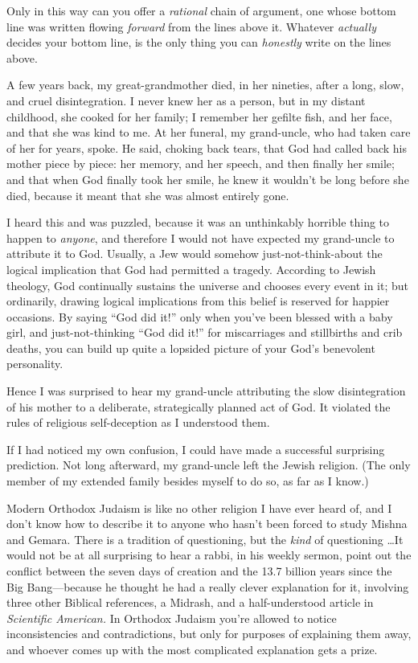 {
 Only in this way can you offer a \textit{rational} chain of
argument, one whose bottom line was written flowing \textit{forward}
from the lines above it. Whatever \textit{actually} decides your bottom
line, is the only thing you can \textit{honestly} write on the lines
above.}

\myendsectiontext


{
 A few years back, my great-grandmother died, in her nineties,
after a long, slow, and cruel disintegration. I never knew her as a
person, but in my distant childhood, she cooked for her family; I
remember her gefilte fish, and her face, and that she was kind to me.
At her funeral, my grand-uncle, who had taken care of her for years,
spoke. He said, choking back tears, that God had called back his mother
piece by piece: her memory, and her speech, and then finally her smile;
and that when God finally took her smile, he knew it
wouldn't be long before she died, because it meant that
she was almost entirely gone. }

{
 I heard this and was puzzled, because it was an unthinkably
horrible thing to happen to \textit{anyone}, and therefore I would not
have expected my grand-uncle to attribute it to God. Usually, a Jew
would somehow just-not-think-about the logical implication that God had
permitted a tragedy. According to Jewish theology, God continually
sustains the universe and chooses every event in it; but ordinarily,
drawing logical implications from this belief is reserved for happier
occasions. By saying ``God did it!''
only when you've been blessed with a baby girl, and
just-not-thinking ``God did it!''
for miscarriages and stillbirths and crib deaths, you can build up
quite a lopsided picture of your God's benevolent
personality.}

{
 Hence I was surprised to hear my grand-uncle attributing the slow
disintegration of his mother to a deliberate, strategically planned act
of God. It violated the rules of religious self-deception as I
understood them.}

{
 If I had noticed my own confusion, I could have made a successful
surprising prediction. Not long afterward, my grand-uncle left the
Jewish religion. (The only member of my extended family besides myself
to do so, as far as I know.)}

{
 Modern Orthodox Judaism is like no other religion I have ever
heard of, and I don't know how to describe it to anyone
who hasn't been forced to study Mishna and Gemara.
There is a tradition of questioning, but the \textit{kind} of
questioning \ldots It would not be at all surprising to hear a rabbi, in
his weekly sermon, point out the conflict between the seven days of
creation and the 13.7 billion years since the Big Bang---because he
thought he had a really clever explanation for it, involving three
other Biblical references, a Midrash, and a half-understood article in
\textit{Scientific American.} In Orthodox Judaism
you're allowed to notice inconsistencies and
contradictions, but only for purposes of explaining them away, and
whoever comes up with the most complicated explanation gets a prize.}


